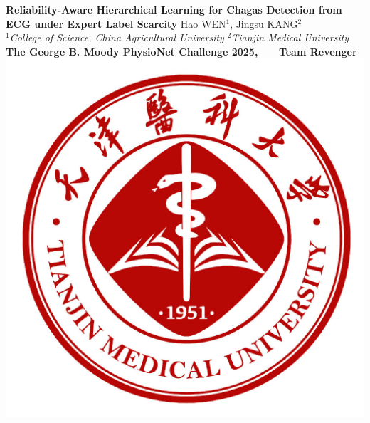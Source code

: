 \documentclass[a0paper,portrait]{baposter}
\begin{document}
\begin{poster}
{
{\bf \fontsize{17pt}{17pt} \selectfont Reliability-Aware Hierarchical Learning for Chagas Detection from ECG under Expert Label Scarcity}
} %
{\vspace{0.3em} \smaller Hao WEN$^1$, Jingsu KANG$^2$  \\  %

$^1${\it College of Science, China Agricultural University}\qquad
$^2${\it Tianjin Medical University} \\
\vspace{0.2cm}
{\Large \bf{The George B. Moody PhysioNet Challenge 2025}, ~~~\bf{Team Revenger}}
}
{\includegraphics[scale=0.097]{logo_tmu.jpeg}}


\newif\ifcoloredtext
\coloredtexttrue
\newif\ifboxednn
\boxednntrue



\end{poster}
\end{document}
